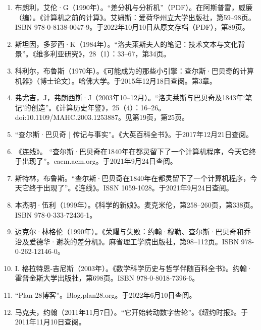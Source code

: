 \begin{enumerate}
\item 布朗利，艾伦·G（1990年）。“差分机与分析机”（PDF）。在阿斯普雷，威廉（编）。《计算机之前的计算》。艾姆斯：爱荷华州立大学出版社，第59–98页。ISBN 978-0-8138-0047-9。于2022年10月10日从原文存档（PDF），第89页。
\item 斯坦因，多萝西·K（1984年）。“洛夫莱斯夫人的笔记：技术文本与文化背景”。《维多利亚研究》，28（1）：33–67，第34页。
\item 科利尔，布鲁斯（1970年）。《可能成为的那些小引擎：查尔斯·巴贝奇的计算机器》（博士论文）。哈佛大学。于2015年12月18日查阅。第3章。
\item 弗尤吉，J，弗朗西斯·J（2003年10–12月）。“洛夫莱斯与巴贝奇及1843年‘笔记’的创造”。《计算历史年鉴》，25（4）：16–26。doi:10.1109/MAHC.2003.1253887。见第19页，第25页。
\item “查尔斯·巴贝奇 | 传记与事实”。《大英百科全书》。于2017年12月21日查阅。
\item 《连线》。 “查尔斯·巴贝奇在1840年在都灵留下了一个计算机程序，今天它终于出现了”。cacm.acm.org。于2021年9月24日查阅。
\item 斯特林，布鲁斯。“查尔斯·巴贝奇在1840年在都灵留下了一个计算机程序，今天它终于出现了”。《连线》。ISSN 1059-1028。于2021年9月24日查阅。
\item 本杰明·伍利（1999年）。《科学的新娘》。麦克米伦，第258–260页，第338页。ISBN 978-0-333-72436-1。
\item 迈克尔·林格伦（1990年）。《荣耀与失败：约翰·穆勒、查尔斯·巴贝奇和乔治及爱德华·谢茨的差分机》。麻省理工学院出版社，第98–112页。ISBN 978-0-262-12146-0。
\item I. 格拉特恩-吉尼斯（2003年）。《数学科学历史与哲学伴随百科全书》。约翰·霍普金斯大学出版社，第698页。ISBN 978-0-8018-7396-6。
\item “Plan 28博客”。Blog.plan28.org。于2022年6月10日查阅。
\item 马克夫，约翰（2011年11月7日）。“它开始转动数字齿轮”。《纽约时报》。于2011年11月10日查阅。
\end{enumerate}